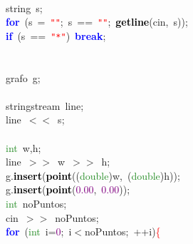 \mbox{} \\
\mbox{}\ \ \ \ string\ s\textcolor{BrickRed}{;} \\
\mbox{}\ \ \ \ \textbf{\textcolor{Blue}{for}}\ \textcolor{BrickRed}{(}s\ \textcolor{BrickRed}{=}\ \texttt{\textcolor{Red}{"{}"{}}}\textcolor{BrickRed}{;}\ s\ \textcolor{BrickRed}{==}\ \texttt{\textcolor{Red}{"{}"{}}}\textcolor{BrickRed}{;}\ \textbf{\textcolor{Black}{getline}}\textcolor{BrickRed}{(}cin\textcolor{BrickRed}{,}\ s\textcolor{BrickRed}{));} \\
\mbox{}\ \ \ \ \textbf{\textcolor{Blue}{if}}\ \textcolor{BrickRed}{(}s\ \textcolor{BrickRed}{==}\ \texttt{\textcolor{Red}{"{}*"{}}}\textcolor{BrickRed}{)}\ \textbf{\textcolor{Blue}{break}}\textcolor{BrickRed}{;} \\
\mbox{} \\
\mbox{} \\
\mbox{}\ \ \ \ grafo\ g\textcolor{BrickRed}{;} \\
\mbox{} \\
\mbox{}\ \ \ \ stringstream\ line\textcolor{BrickRed}{;} \\
\mbox{}\ \ \ \ line\ \textcolor{BrickRed}{$<$$<$}\ s\textcolor{BrickRed}{;} \\
\mbox{} \\
\mbox{}\ \ \ \ \textcolor{ForestGreen}{int}\ w\textcolor{BrickRed}{,}h\textcolor{BrickRed}{;} \\
\mbox{}\ \ \ \ line\ \textcolor{BrickRed}{$>$$>$}\ w\ \textcolor{BrickRed}{$>$$>$}\ h\textcolor{BrickRed}{;} \\
\mbox{}\ \ \ \ g\textcolor{BrickRed}{.}\textbf{\textcolor{Black}{insert}}\textcolor{BrickRed}{(}\textbf{\textcolor{Black}{point}}\textcolor{BrickRed}{((}\textcolor{ForestGreen}{double}\textcolor{BrickRed}{)}w\textcolor{BrickRed}{,}\ \textcolor{BrickRed}{(}\textcolor{ForestGreen}{double}\textcolor{BrickRed}{)}h\textcolor{BrickRed}{));} \\
\mbox{}\ \ \ \ g\textcolor{BrickRed}{.}\textbf{\textcolor{Black}{insert}}\textcolor{BrickRed}{(}\textbf{\textcolor{Black}{point}}\textcolor{BrickRed}{(}\textcolor{Purple}{0.00}\textcolor{BrickRed}{,}\ \textcolor{Purple}{0.00}\textcolor{BrickRed}{));} \\
\mbox{}\ \ \ \ \textcolor{ForestGreen}{int}\ noPuntos\textcolor{BrickRed}{;} \\
\mbox{}\ \ \ \ cin\ \textcolor{BrickRed}{$>$$>$}\ noPuntos\textcolor{BrickRed}{;} \\
\mbox{}\ \ \ \ \textbf{\textcolor{Blue}{for}}\ \textcolor{BrickRed}{(}\textcolor{ForestGreen}{int}\ i\textcolor{BrickRed}{=}\textcolor{Purple}{0}\textcolor{BrickRed}{;}\ i\textcolor{BrickRed}{$<$}noPuntos\textcolor{BrickRed}{;}\ \textcolor{BrickRed}{++}i\textcolor{BrickRed}{)}\textcolor{Red}{\{} \\
